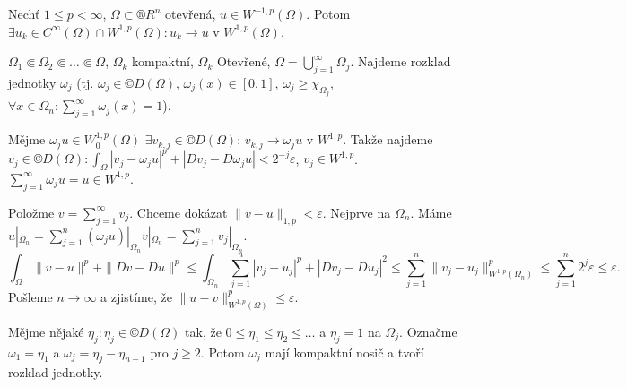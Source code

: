 \documentclass[12pt]{article}					%
\begin{document}
\begin{veta}
	Nechť $1 ≤ p < ∞$, $Ω \subset ®R^n$ otevřená, $u \in W^{-1, p}(Ω)$. Potom $\exists u_k \in C^∞(Ω) \cap W^{1, p}(Ω): u_k \rightarrow u$ v $W^{1, p}(Ω)$.

	\begin{dukazin}
		$Ω_1 \Subset Ω_2 \Subset … \Subset Ω$, $\overline{Ω_k}$ kompaktní, $Ω_k$ Otevřené, $Ω = \bigcup_{j=1}^∞ Ω_j$. Najdeme rozklad jednotky $ω_j$ (tj. $ω_j \in ©D(Ω)$, $ω_j(x) \in [0, 1]$, $ω_j ≥ χ_{Ω_j}$, $\forall x \in Ω_n: \sum_{j=1}^∞ ω_j(x) = 1$).

		Mějme $ω_ju \in W^{1, p}_0(Ω)$ $\exists v_{k, j} \in ©D(Ω)$: $v_{k, j} \rightarrow ω_j u$ v $W^{1, p}$. Takže najdeme $v_j \in ©D(Ω): \int_Ω |v_j - ω_j u|^p + |Dv_j - Dω_j u| < 2^{-j} ε$, $v_j \in W^{1, p}$. $\sum_{j=1}^∞ ω_j u = u \in W^{1, p}$.

		Položme $v = \sum_{j=1}^∞ v_j$. Chceme dokázat $\|v - u\|_{1, p} < ε$. Nejprve na $Ω_n$. Máme $u|_{Ω_n} = \sum_{j=1}^n (ω_j u) |_{Ω_n} v|_{Ω_n}  = \sum_{j=1}^n v_j|_{Ω_n}$.
		$$ \!\!\!\int_Ω \|v - u\|^p + \|Dv - Du\|^p ≤ \int_{Ω_n} \sum_{j=1}^n |v_j - u_j|^p + |Dv_j - Du_j|^2 ≤ \sum_{j=1}^n \|v_j - u_j\|_{W^{1, p}(Ω_n)}^p ≤ \sum_{j=1}^n 2^j ε ≤ ε.\!\! $$
		Pošleme $n \rightarrow ∞$ a zjistíme, že $\|u - v\|_{W^{1, p}(Ω)}^p ≤ ε$.
	\end{dukazin}

	\begin{poznamkain}
		Mějme nějaké $η_j: η_j \in ©D(Ω)$ tak, že $0 ≤ η_1 ≤ η_2 ≤ …$ a $η_j = 1$ na $Ω_j$. Označme $ω_1 = η_1$ a $ω_j = η_j - η_{n-1}$ pro $j ≥ 2$. Potom $ω_j$ mají kompaktní nosič a tvoří rozklad jednotky.
	\end{poznamkain}
\end{veta}
\end{document}
